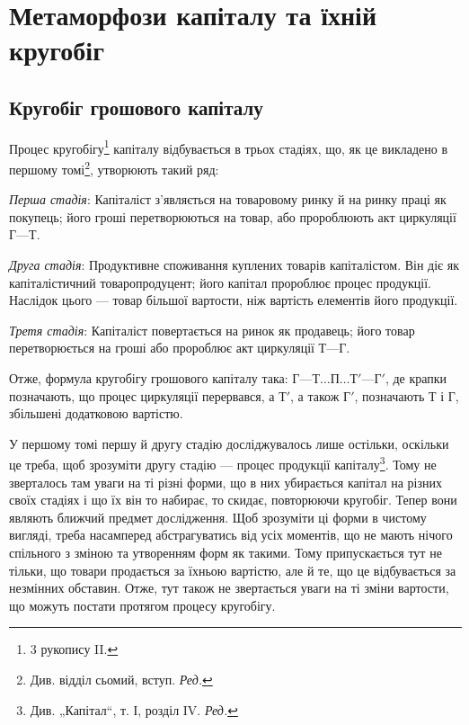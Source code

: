 \parcont{}  %

\chapter{Метаморфози капіталу та їхній кругобіг}

\section{Кругобіг грошового капіталу}

Процес кругобігу\footnote{
3 рукопису II.
} капіталу відбувається в трьох стадіях, що, як
це викладено в першому томі\footnote*{
Див. відділ сьомий, вступ. \emph{Ред.}
}, утворюють такий ряд:

\emph{Перша стадія}: Капіталіст з’являється на товаровому ринку й на
ринку праці як покупець; його гроші перетворюються на товар, або пророблюють
акт циркуляції $Г — Т$.

\emph{Друга стадія}: Продуктивне споживання куплених товарів капіталістом.
Він діє як капіталістичний товаропродуцент; його капітал пророблює
процес продукції. Наслідок цього — товар більшої вартости, ніж
вартість елементів його продукції.

\emph{Третя стадія}: Капіталіст повертається на ринок як продавець; його
товар перетворюється на гроші або пророблює акт циркуляції $Т — Г$.

Отже, формула кругобігу грошового капіталу така: $Г — Т\dots{} П\dots{} Т' —
Г'$, де крапки позначають, що процес циркуляції перервався, а $Т'$, а
також $Г'$, позначають Т і Г, збільшені додатковою вартістю.

У першому томі першу й другу стадію досліджувалось лише остільки,
оскільки це треба, щоб зрозуміти другу стадію — процес продукції капіталу\footnote*{
Див. „Капітал“, т. І, розділ IV. \emph{Ред.}
}.
Тому не зверталось там уваги на ті різні форми, що в них убирається
капітал на різних своїх стадіях і що їх він то набирає, то скидає,
повторюючи кругобіг. Тепер вони являють ближчий предмет дослідження.
Щоб зрозуміти ці форми в чистому вигляді, треба насамперед абстрагуватись
від усіх моментів, що не мають нічого спільного з зміною та
утворенням форм як такими. Тому припускається тут не тільки, що товари
продається за їхньою вартістю, але й те, що це відбувається за
незмінних обставин. Отже, тут також не звертається уваги на ті зміни
вартости, що можуть постати протягом процесу кругобігу.
